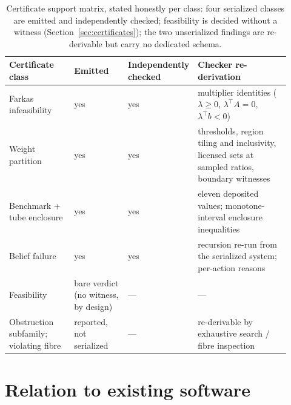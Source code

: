 \documentclass[11pt]{article}
\begin{document}
\begin{table}[t]
\centering\small
\setlength{\tabcolsep}{3pt}
\begin{tabular}{@{}p{0.24\linewidth}p{0.20\linewidth}p{0.12\linewidth}p{0.36\linewidth}@{}}
\toprule
Certificate class & Emitted & Independently checked & Checker re-derivation \\
\midrule
Farkas infeasibility & yes & yes & multiplier identities
($\lambda \geq 0$, $\lambda^{\top} A = 0$, $\lambda^{\top} b < 0$) \\
Weight partition & yes & yes & thresholds, region tiling and
inclusivity, licensed sets at sampled ratios, boundary witnesses \\
Benchmark + tube enclosure & yes & yes & eleven deposited values;
monotone-interval enclosure inequalities \\
Belief failure & yes & yes & recursion re-run from the serialized
system; per-action reasons \\
Feasibility & bare verdict (no witness, by design) & --- & --- \\
Obstruction subfamily; violating fibre & reported, not serialized &
--- & re-derivable by exhaustive search / fibre inspection \\
\bottomrule
\end{tabular}
\caption{Certificate support matrix, stated honestly per class: four
serialized classes are emitted and independently checked; feasibility is
decided without a witness (Section~\ref{sec:certificates}); the two
unserialized findings are re-derivable but carry no dedicated schema.}
\label{tab:certmatrix}
\end{table}

\section{Relation to existing software}\label{sec:related}
\end{document}
